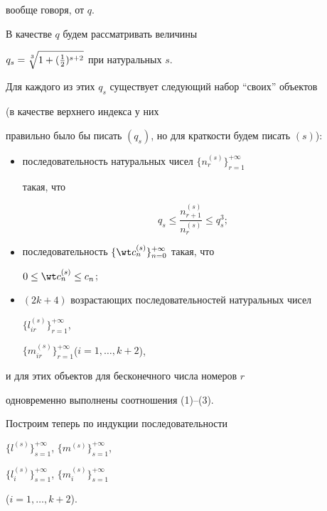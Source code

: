 вообще говоря, от $q$.





В качестве $q$ будем рассматривать величины


$q_s=\sqrt[\uproot{2}3]{1+(\frac{1}{2})^{s+2}}$ при натуральных $s$.





Для каждого из этих $q_s$ существует следующий набор ``своих'' объектов


(в качестве верхнего индекса у них


правильно было бы писать $(q_s)$, но для краткости будем писать $(s)$):


\begin{itemize}


\item[I)] последовательность натуральных чисел $\{n_r^{(s)}\}_{r=1}^{+\infty}$


такая, что 


$$


q_s \le \frac{n_{r+1}^{(s)}}{n_r^{(s)}} \le q_s^3;


$$


\item[II)] последовательность $\{\wt c{}_n^{(s)} \}_{n=0}^{+\infty}$ такая, что


$0 \le \wt c{}_n^{(s)} \le c_n$;


\item[III)] $(2k+4)$ возрастающих последовательностей натуральных чисел


$\{l_{ir}^{(s)} \}_{r=1}^{+\infty}$, 


$\{m_{ir}^{(s)}\}_{r=1}^{+\infty}$\linebreak ($i=1,\dotsc, k+2$),


\end{itemize}


и для этих объектов для бесконечного числа номеров $r$ 


одновременно выполнены соотношения (1)--(3).





Построим теперь по индукции последовательности 


$\{l^{(s)} \}_{s=1}^{+\infty}$, $\{m^{(s)} \}_{s=1}^{+\infty}$,


$\{l_i^{(s)} \}_{s=1}^{+\infty}$, $\{m_i^{(s)} \}_{s=1}^{+\infty}$\linebreak


($i=1, \dotsc, k+2$).


